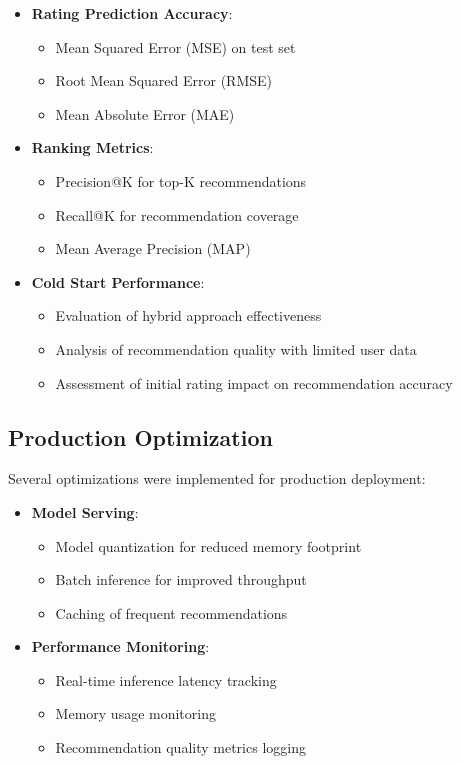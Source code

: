 \documentclass[12pt]{article}
\begin{document}
\begin{itemize}
    \item \textbf{Rating Prediction Accuracy}:
    \begin{itemize}
        \item Mean Squared Error (MSE) on test set
        \item Root Mean Squared Error (RMSE)
        \item Mean Absolute Error (MAE)
    \end{itemize}
    
    \item \textbf{Ranking Metrics}:
    \begin{itemize}
        \item Precision@K for top-K recommendations
        \item Recall@K for recommendation coverage
        \item Mean Average Precision (MAP)
    \end{itemize}
    
    \item \textbf{Cold Start Performance}:
    \begin{itemize}
        \item Evaluation of hybrid approach effectiveness
        \item Analysis of recommendation quality with limited user data
        \item Assessment of initial rating impact on recommendation accuracy
    \end{itemize}
\end{itemize}

\subsection{Production Optimization}
Several optimizations were implemented for production deployment:

\begin{itemize}
    \item \textbf{Model Serving}:
    \begin{itemize}
        \item Model quantization for reduced memory footprint
        \item Batch inference for improved throughput
        \item Caching of frequent recommendations
    \end{itemize}
    
    \item \textbf{Performance Monitoring}:
    \begin{itemize}
        \item Real-time inference latency tracking
        \item Memory usage monitoring
        \item Recommendation quality metrics logging
    \end{itemize}
\end{itemize}
\end{document}
